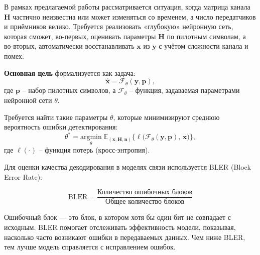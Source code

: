 \documentclass{article}
\begin{document}
В рамках предлагаемой работы рассматривается ситуация, когда матрица канала \(\mathbf{H}\) частично неизвестна или может изменяться со временем, а число передатчиков и приёмников велико. Требуется реализовать «глубокую» нейронную сеть, которая сможет, во-первых, оценивать параметры \(\mathbf{H}\) по пилотным символам, а во-вторых, автоматически восстанавливать \(\mathbf{x}\) из \(\mathbf{y}\) с учётом сложности канала и помех.

\textbf{Основная цель} формализуется как задача:
\begin{equation}
\hat{\mathbf{x}} = \mathcal{F}_\theta(\mathbf{y}, \mathbf{p}),
\end{equation}
где \(\mathbf{p}\) – набор пилотных символов, а \(\mathcal{F}_\theta\) – функция, задаваемая параметрами нейронной сети \(\theta\). 

Требуется найти такие параметры \(\theta\), которые минимизируют среднюю вероятность ошибки детектирования:
\begin{equation}
\theta^* = \underset{\theta}{\mathrm{argmin}} \; \mathbb{E}_{(\mathbf{x},\mathbf{H},\mathbf{n})} 
\Big\{ \ell\big(\mathcal{F}_\theta(\mathbf{y}, \mathbf{p}),\, \mathbf{x}\big) \Big\},
\end{equation}
где \(\ell(\cdot)\) – функция потерь (кросс-энтропия).

Для оценки качества декодирования в моделях связи используется BLER (Block Error Rate): 

\begin{equation}
\text{BLER} = \frac{\text{Количество ошибочных блоков}}{\text{Общее количество блоков}} 
\end{equation}

Ошибочный блок — это блок, в котором хотя бы один бит не совпадает с исходным. BLER помогает отслеживать эффективность модели, показывая, насколько часто возникают ошибки в передаваемых данных. Чем ниже BLER, тем лучше модель справляется с исправлением ошибок.

\clearpage


\end{document}
